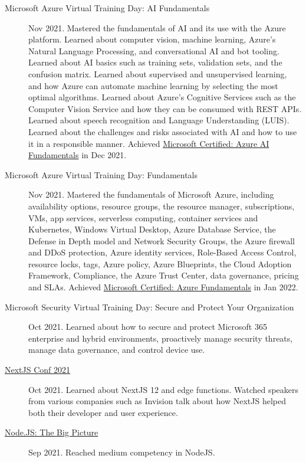 \documentclass{article}
\begin{document}
\begin{description}
  \item [Microsoft Azure Virtual Training Day: AI Fundamentals] Nov 2021. Mastered the fundamentals of AI and its use with the Azure platform. Learned about computer vision, machine learning, Azure's Natural Language Processing, and conversational AI and bot tooling. Learned about AI basics such as training sets, validation sets, and the confusion matrix. Learned about supervised and unsupervised learning, and how Azure can automate machine learning by selecting the most optimal algorithms. Learned about Azure's Cognitive Services such as the Computer Vision Service and how they can be consumed with REST APIs. Learned about speech recognition and Language Understanding (LUIS). Learned about the challenges and risks associated with AI and how to use it in a responsible manner. Achieved \href{https://www.credly.com/badges/fa66cf6b-dff5-4f58-9f4e-4b94fc91b7fa/public_url}{Microsoft Certified: Azure AI Fundamentals} in Dec 2021.
  \item [Microsoft Azure Virtual Training Day: Fundamentals] Nov 2021. Mastered the fundamentals of Microsoft Azure, including availability options, resource groups, the resource manager, subscriptions, VMs, app services, serverless computing, container services and Kubernetes, Windows Virtual Desktop, Azure Database Service, the Defense in Depth model and Network Security Groups, the Azure firewall and DDoS protection, Azure identity services, Role-Based Access Control, resource locks, tags, Azure policy, Azure Blueprints, the Cloud Adoption Framework, Compliance, the Azure Trust Center, data governance, pricing and SLAs. Achieved \href{https://www.credly.com/badges/56339905-a587-4fdb-9906-c2d2bb5d31da/public_url}{Microsoft Certified: Azure Fundamentals} in Jan 2022.
  \item [Microsoft Security Virtual Training Day: Secure and Protect Your Organization] Oct 2021. Learned about how to secure and protect Microsoft 365 enterprise and hybrid environments, proactively manage security threats, manage data governance, and control device use.
  \item [\href{https://www.linkedin.com/posts/alexander-koik-cestone-89304556_alexander-koik-cestones-nextjs-conf-ticket-activity-6855242508260184065-xJP9/}{NextJS Conf 2021}] Oct 2021. Learned about NextJS 12 and edge functions. Watched speakers from various companies such as Invision talk about how NextJS helped both their developer and user experience.
  \item [\href{https://sirkoik.github.io/CurriculumVitae/certifications/Nodejs-The-Big-Picture/certificate.pdf}{Node.JS: The Big Picture}] Sep 2021. Reached medium competency in NodeJS.

\end{description}
\end{document}
